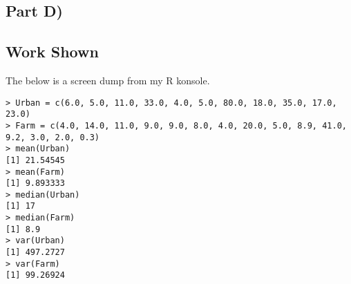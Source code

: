 \documentclass[11pt]{article}
\begin{document}
\subsection{Part D)}
\label{sec:orgf4cf8b5}

\subsection{Work Shown}
\label{sec:org1b1dda8}
The below is a screen dump from my R konsole.

\begin{verbatim}
> Urban = c(6.0, 5.0, 11.0, 33.0, 4.0, 5.0, 80.0, 18.0, 35.0, 17.0, 23.0)
> Farm = c(4.0, 14.0, 11.0, 9.0, 9.0, 8.0, 4.0, 20.0, 5.0, 8.9, 41.0, 9.2, 3.0, 2.0, 0.3)
> mean(Urban)
[1] 21.54545
> mean(Farm)
[1] 9.893333
> median(Urban)
[1] 17
> median(Farm)
[1] 8.9
> var(Urban)
[1] 497.2727
> var(Farm)
[1] 99.26924
\end{verbatim}
\end{document}
